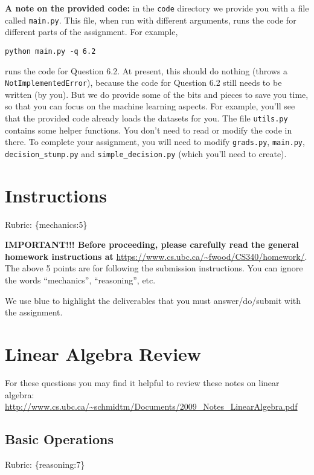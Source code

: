\documentclass{article}
\def\rubric#1{\gre{Rubric: \{#1\}}}{}
\def\blu#1{{\color{blu}#1}}
\def\gre#1{{\color{gre}#1}}
\begin{document}
\textbf{A note on the provided code:} in the \texttt{code} directory we provide you with a file called
\texttt{main.py}. This file, when run with different arguments, runs the code for different
parts of the assignment. For example,
\begin{verbatim}
python main.py -q 6.2
\end{verbatim}
runs the code for Question 6.2. At present, this should do nothing (throws a \texttt{NotImplementedError}), because the code
for Question 6.2 still needs to be written (by you). But we do provide some of the bits
and pieces to save you time, so that you can focus on the machine learning aspects.
For example, you'll see that the provided code already loads the datasets for you.
The file \texttt{utils.py} contains some helper functions.
You don't need to read or modify the code in there.
To complete your assignment, you will need to modify \texttt{grads.py}, \texttt{main.py}, \texttt{decision\string_stump.py} and \texttt{simple\string_decision.py} (which you'll need to create).


\section*{Instructions}
\rubric{mechanics:5}

\textbf{IMPORTANT!!! Before proceeding, please carefully read the general homework instructions at} \url{https://www.cs.ubc.ca/~fwood/CS340/homework/}. The above 5 points are for following the submission instructions. You can ignore the words ``mechanics'', ``reasoning'', etc.

\vspace{1em}
We use \blu{blue} to highlight the deliverables that you must answer/do/submit with the assignment.

\section{Linear Algebra Review}

For these questions you may find it helpful to review these notes on linear algebra:\\
\url{http://www.cs.ubc.ca/~schmidtm/Documents/2009_Notes_LinearAlgebra.pdf}

\subsection{Basic Operations}
\rubric{reasoning:7}
\end{document}
